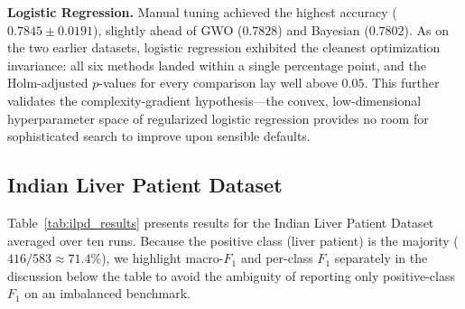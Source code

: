 \documentclass[letterpaper, 10 pt, conference]{ieeeconf}
\begin{document}
\textbf{Logistic Regression.} Manual tuning achieved the highest accuracy ($0.7845 \pm 0.0191$), slightly ahead of GWO ($0.7828$) and Bayesian ($0.7802$). As on the two earlier datasets, logistic regression exhibited the cleanest optimization invariance: all six methods landed within a single percentage point, and the Holm-adjusted $p$-values for every comparison lay well above $0.05$. This further validates the complexity-gradient hypothesis---the convex, low-dimensional hyperparameter space of regularized logistic regression provides no room for sophisticated search to improve upon sensible defaults.

\subsection{Indian Liver Patient Dataset}
\label{subsec:ilpd_results}

Table~\ref{tab:ilpd_results} presents results for the Indian Liver Patient Dataset averaged over ten runs. Because the positive class (liver patient) is the majority ($416/583 \approx 71.4\%$), we highlight macro-$F_1$ and per-class $F_1$ separately in the discussion below the table to avoid the ambiguity of reporting only positive-class $F_1$ on an imbalanced benchmark.
\end{document}
